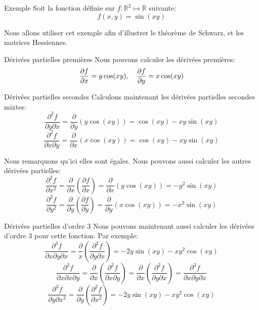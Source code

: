 \documentclass[a4paper]{article}
\begin{document}
\begin{parag}{Exemple}
    Soit la fonction définie sur $f : \mathbb{R}^2 \mapsto \mathbb{R}$ suivante: 
    \[f\left(x, y\right) = \sin\left(xy\right)\]

    Nous allons utiliser cet exemple afin d'illustrer le théorème de Schwarz, et les matrices Hessiennes.
    
    \begin{subparag}{Dérivées partielles premières}
        Nous pouvons calculer les dérivées premières:
        \[\frac{\partial f}{\partial x} = y\cos\left(xy\right), \mathspace \frac{\partial f}{\partial y} = x\cos\left(xy\right)\]
    \end{subparag}
    
    \begin{subparag}{Dérivées partielles secondes}
        Calculons maintenant les dérivées partielles secondes mixtes: 
        \[\frac{\partial^2 f}{\partial y \partial x} = \frac{\partial}{\partial y}\left(y \cos\left(xy\right)\right) = \cos\left(xy\right) - xy\sin\left(xy\right)\] 
        \[\frac{\partial^2 f}{\partial x \partial y} = \frac{\partial}{\partial x} \left(x \cos\left(xy\right)\right) = \cos\left(xy\right) - xy \sin\left(xy\right)\]
        
        Nous remarquons qu'ici elles sont égales. Nous pouvons aussi calculer les autres dérivées partielles: 
        \[\frac{\partial^2 f}{\partial x^2} = \frac{\partial}{\partial x} \left(\frac{\partial f}{\partial x}\right) = \frac{\partial}{\partial x}\left(y \cos\left(xy\right)\right) = -y^2 \sin\left(xy\right)\]
        \[\frac{\partial^2 f}{\partial y^2} = \frac{\partial}{\partial y}\left(\frac{\partial f}{\partial y}\right) = \frac{\partial}{\partial y}\left(x \cos\left(xy\right)\right) = -x^2 \sin\left(xy\right)\]
    \end{subparag}

    \begin{subparag}{Dérivées partielles d'ordre 3}
        Nous pouvons maintenant aussi calculer les dérivées d'ordre 3 pour cette fonction. Par exemple: 
        \[\frac{\partial^3 f}{\partial x \partial y \partial x} = \frac{\partial}{x} \left(\frac{\partial^2 f}{\partial y \partial x}\right) = -2y\sin\left(xy\right) - xy^2 \cos\left(xy\right)\]
        \[\frac{\partial^3 f}{\partial x \partial x \partial y} = \frac{\partial}{\partial x} \left(\frac{\partial^2 f}{\partial x \partial y}\right) = \frac{\partial}{\partial x} \left(\frac{\partial^2 f}{\partial y \partial x}\right) = \frac{\partial^3 f}{\partial x \partial y \partial x}\]
        \[\frac{\partial^3 f}{\partial y \partial x^2} = \frac{\partial}{\partial y}\left(\frac{\partial^2 f}{\partial x^2}\right) = -2y\sin\left(xy\right) - xy^2 \cos\left(xy\right)\]


\end{subparag}
\end{parag}
\end{document}
